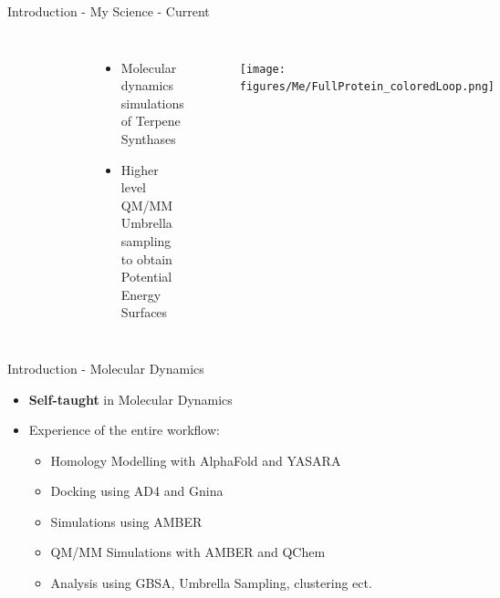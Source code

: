 \begin{frame}{Introduction - My Science - Current}
\begin{columns}
\begin{figure}
\includegraphics[width=0.4\textwidth]{figures/Me/Wham_Hist}
\end{figure}
\begin{itemize}
	\item Molecular dynamics simulations of Terpene Synthases
	\item Higher level QM/MM Umbrella sampling to obtain Potential Energy Surfaces
\end{itemize}

\begin{figure}
\texttt{[image: figures/Me/FullProtein\_coloredLoop.png]}
\end{figure}
\end{columns}
\end{frame}

\begin{frame}{Introduction - Molecular Dynamics}
\begin{itemize}
\item \textbf{Self-taught} in Molecular Dynamics

\item Experience of the entire workflow:
	\begin{itemize}
		\item Homology Modelling with AlphaFold and YASARA
		\item Docking using AD4 and Gnina
		\item Simulations using AMBER
		\item QM/MM Simulations with AMBER and QChem
		\item Analysis using GBSA, Umbrella Sampling, clustering ect.
	\end{itemize}
\end{itemize}
\end{frame}
